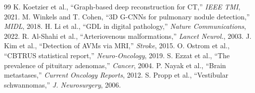 \documentclass[10pt,twocolumn,letterpaper]{article}
\begin{document}
\begin{thebibliography}{99}
 K. Koetzier et al., ``Graph-based deep reconstruction for CT,'' \textit{IEEE TMI}, 2021.
 M. Winkels and T. Cohen, ``3D G-CNNs for pulmonary nodule detection,'' \textit{MIDL}, 2018.
 H. Li et al., ``GDL in digital pathology,'' \textit{Nature Communications}, 2022.
 R. Al-Shahi et al., ``Arteriovenous malformations,'' \textit{Lancet Neurol.}, 2003.
 J. Kim et al., ``Detection of AVMs via MRI,'' \textit{Stroke}, 2015.
 O. Ostrom et al., ``CBTRUS statistical report,'' \textit{Neuro-Oncology}, 2019.
 S. Ezzat et al., ``The prevalence of pituitary adenomas,'' \textit{Cancer}, 2004.
 P. Nayak et al., ``Brain metastases,'' \textit{Current Oncology Reports}, 2012.
 S. Propp et al., ``Vestibular schwannomas,'' \textit{J. Neurosurgery}, 2006.
\end{thebibliography}
\end{document}
